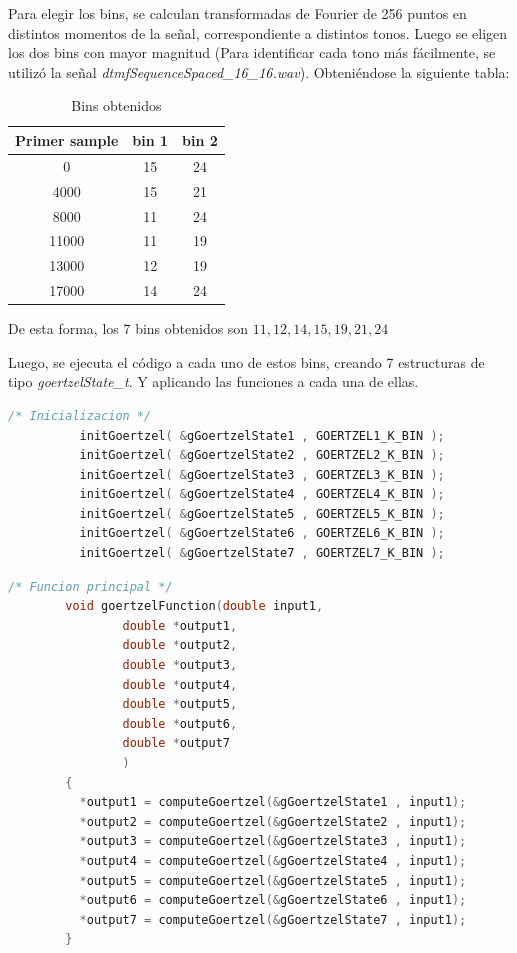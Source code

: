 \documentclass[letterpaper,onecolumn,10pt,journal,final]{IEEEtran}
\begin{document}
\begin{enumerate}[1)]
    Para elegir los bins, se calculan transformadas de Fourier de 256 puntos en distintos momentos de la señal, correspondiente a distintos tonos. Luego se eligen los dos bins con mayor magnitud (Para identificar cada tono más fácilmente, se utilizó la señal \textit{dtmfSequenceSpaced\_16\_16.wav}). Obteniéndose la siguiente tabla:
    \begin{table}[H]
        \centering
        \begin{tabular}{|c|c|c|}
        \hline
        Primer sample & bin 1 & bin 2 \\
        \hline
        0 & 15 & 24 \\
        4000 & 15 & 21 \\
        8000 & 11 & 24 \\
        11000 & 11 & 19 \\
        13000 & 12 & 19 \\
        17000 & 14 & 24 \\
        \hline
        \end{tabular}
        \caption{Bins obtenidos}
        \label{tab:tabla6}
    \end{table}
    
    De esta forma, los 7 bins obtenidos son $11, 12, 14, 15, 19, 21, 24$
    
    Luego, se ejecuta el código a cada uno de estos bins, creando 7 estructuras de tipo \textit{goertzelState\_t}. Y aplicando las funciones a cada una de ellas.
    \begin{lstlisting}[language=C]
        /* Inicializacion */
          initGoertzel( &gGoertzelState1 , GOERTZEL1_K_BIN );
          initGoertzel( &gGoertzelState2 , GOERTZEL2_K_BIN );
          initGoertzel( &gGoertzelState3 , GOERTZEL3_K_BIN );
          initGoertzel( &gGoertzelState4 , GOERTZEL4_K_BIN );
          initGoertzel( &gGoertzelState5 , GOERTZEL5_K_BIN );
          initGoertzel( &gGoertzelState6 , GOERTZEL6_K_BIN );
          initGoertzel( &gGoertzelState7 , GOERTZEL7_K_BIN );
    \end{lstlisting}
    \begin{lstlisting}[language=C]
    /* Funcion principal */
        void goertzelFunction(double input1,
				double *output1,
				double *output2,
				double *output3,
				double *output4,
				double *output5,
				double *output6,
				double *output7
				)
        {
          *output1 = computeGoertzel(&gGoertzelState1 , input1);
          *output2 = computeGoertzel(&gGoertzelState2 , input1);
          *output3 = computeGoertzel(&gGoertzelState3 , input1);
          *output4 = computeGoertzel(&gGoertzelState4 , input1);
          *output5 = computeGoertzel(&gGoertzelState5 , input1);
          *output6 = computeGoertzel(&gGoertzelState6 , input1);
          *output7 = computeGoertzel(&gGoertzelState7 , input1);
        }
    \end{lstlisting}
    

\end{enumerate}
\end{document}
